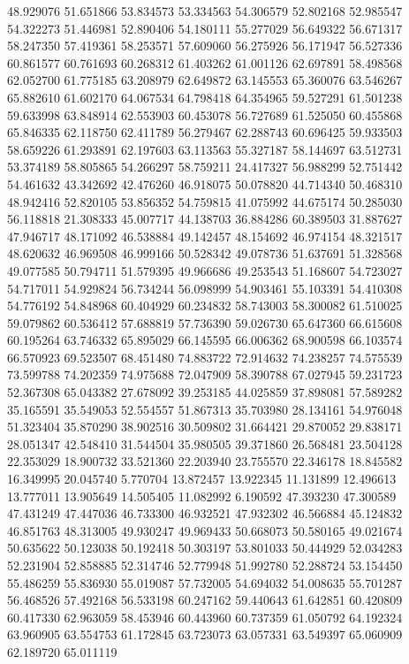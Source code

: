 48.929076
51.651866
53.834573
53.334563
54.306579
52.802168
52.985547
54.322273
51.446981
52.890406
54.180111
55.277029
56.649322
56.671317
58.247350
57.419361
58.253571
57.609060
56.275926
56.171947
56.527336
60.861577
60.761693
60.268312
61.403262
61.001126
62.697891
58.498568
62.052700
61.775185
63.208979
62.649872
63.145553
65.360076
63.546267
65.882610
61.602170
64.067534
64.798418
64.354965
59.527291
61.501238
59.633998
63.848914
62.553903
60.453078
56.727689
61.525050
60.455868
65.846335
62.118750
62.411789
56.279467
62.288743
60.696425
59.933503
58.659226
61.293891
62.197603
63.113563
55.327187
58.144697
63.512731
53.374189
58.805865
54.266297
58.759211
24.417327
56.988299
52.751442
54.461632
43.342692
42.476260
46.918075
50.078820
44.714340
50.468310
48.942416
52.820105
53.856352
54.759815
41.075992
44.675174
50.285030
56.118818
21.308333
45.007717
44.138703
36.884286
60.389503
31.887627
47.946717
48.171092
46.538884
49.142457
48.154692
46.974154
48.321517
48.620632
46.969508
46.999166
50.528342
49.078736
51.637691
51.328568
49.077585
50.794711
51.579395
49.966686
49.253543
51.168607
54.723027
54.717011
54.929824
56.734244
56.098999
54.903461
55.103391
54.410308
54.776192
54.848968
60.404929
60.234832
58.743003
58.300082
61.510025
59.079862
60.536412
57.688819
57.736390
59.026730
65.647360
66.615608
60.195264
63.746332
65.895029
66.145595
66.006362
68.900598
66.103574
66.570923
69.523507
68.451480
74.883722
72.914632
74.238257
74.575539
73.599788
74.202359
74.975688
72.047909
58.390788
67.027945
59.231723
52.367308
65.043382
27.678092
39.253185
44.025859
37.898081
57.589282
35.165591
35.549053
52.554557
51.867313
35.703980
28.134161
54.976048
51.323404
35.870290
38.902516
30.509802
31.664421
29.870052
29.838171
28.051347
42.548410
31.544504
35.980505
39.371860
26.568481
23.504128
22.353029
18.900732
33.521360
22.203940
23.755570
22.346178
18.845582
16.349995
20.045740
5.770704
13.872457
13.922345
11.131899
12.496613
13.777011
13.905649
14.505405
11.082992
6.190592
47.393230
47.300589
47.431249
47.447036
46.733300
46.932521
47.932302
46.566884
45.124832
46.851763
48.313005
49.930247
49.969433
50.668073
50.580165
49.021674
50.635622
50.123038
50.192418
50.303197
53.801033
50.444929
52.034283
52.231904
52.858885
52.314746
52.779948
51.992780
52.288724
53.154450
55.486259
55.836930
55.019087
57.732005
54.694032
54.008635
55.701287
56.468526
57.492168
56.533198
60.247162
59.440643
61.642851
60.420809
60.417330
62.963059
58.453946
60.443960
60.737359
61.050792
64.192324
63.960905
63.554753
61.172845
63.723073
63.057331
63.549397
65.060909
62.189720
65.011119
